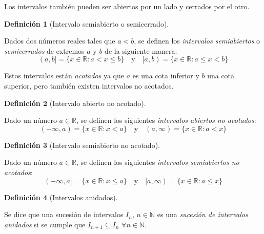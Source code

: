 \documentclass[
  a4paper,
]{scrreport}
\theoremstyle{definition}
\newtheorem{definition}{Definición}[chapter]
\theoremstyle{plain}
\theoremstyle{plain}
\theoremstyle{definition}
\theoremstyle{definition}
\theoremstyle{plain}
\theoremstyle{remark}
\begin{document}
Los intervalos también pueden ser abiertos por un lado y cerrados por el
otro.

\begin{definition}[Intervalo semiabierto o
semicerrado]\protect\hypertarget{def-intervalo-semiabierto}{}\label{def-intervalo-semiabierto}

Dados dos números reales tales que \(a<b\), se definen los
\emph{intervalos semiabiertos} o \emph{semicerrados} de extremos \(a\) y
\(b\) de la siguiente manera: \[
(a,b] = \{x\in \mathbb{R}: a< x\leq b\}\quad \mbox{y}\quad [a,b) = \{x\in \mathbb{R}: a\leq x< b\}
\]

\end{definition}

Estos intervalos están \emph{acotados} ya que \(a\) es una cota inferior
y \(b\) una cota superior, pero también existen intervalos no acotados.

\begin{definition}[Intervalo abierto no
acotado]\protect\hypertarget{def-intervalo-abierto-no-acotado}{}\label{def-intervalo-abierto-no-acotado}

Dado un número \(a\in \mathbb{R}\), se definen los siguientes
\emph{intervalos abiertos no acotados}: \[
(-\infty,a) = \{x\in \mathbb{R}: x<a\} \quad \mbox{y}\quad (a,\infty) = \{x\in \mathbb{R}: a< x\}
\]

\end{definition}

\begin{definition}[Intervalo semiabierto no
acotado]\protect\hypertarget{def-intervalo-semiabierto-no-acotado}{}\label{def-intervalo-semiabierto-no-acotado}

Dado un número \(a\in \mathbb{R}\), se definen los siguientes
\emph{intervalos semiabiertos no acotados}: \[
(-\infty,a] = \{x\in \mathbb{R}: x\leq a\} \quad \mbox{y}\quad [a,\infty) = \{x\in \mathbb{R}: a\leq x\}
\]

\end{definition}

\begin{definition}[Intervalos
anidados]\protect\hypertarget{def-intervalos-anidados}{}\label{def-intervalos-anidados}

Se dice que una sucesión de intervalos \(I_n\), \(n\in\mathbb{N}\) es
una \emph{sucesión de intervalos anidados} si se cumple que
\(I_{n+1}\subseteq I_n\) \(\forall n\in\mathbb{N}\).

\end{definition}
\end{document}
